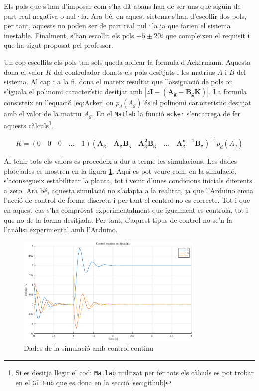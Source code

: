 \documentclass[12pt,a4paper,final,twoside,openright]{report}
\begin{document}
Els pols que s'han d'imposar com s'ha dit abans han de ser uns que siguin de part real negativa o nul·la. Ara bé, en aquest sistema s'han d'escollir dos pols, per tant, aquests no poden ser de part real nul·la ja que farien el sistema inestable. Finalment, s'han escollit els pols $-5\pm20i$ que compleixen el requisit i que ha sigut proposat pel professor. 

Un cop escollits els pols tan sols queda aplicar la formula d'Ackermann. Aquesta dona el valor $K$ del controlador donats els pols desitjats i les matrius $A$ i $B$ del sistema. Al cap i a la fi, dona el mateix resultat que l'assignació de pols on s'iguala el polinomi característic desitjat amb $|z \mathbf{I} - (\mathbf{A_g} - \mathbf{B_g K})|$. La formula consisteix en l'equació \eqref{eq:Acker} on $p_d(A_g)$ és el polinomi característic desitjat amb el valor de la matriu $A_g$. En el \texttt{Matlab} la funció \texttt{acker} s'encarrega de fer aquests càlculs\footnote{Si es desitja llegir el codi \texttt{Matlab} utilitzat per fer tots els càlculs es pot trobar en el \texttt{GitHub} que es dona en la secció \ref{sec:github}}.

\begin{equation}\label{eq:Acker}
K=(0\quad0\quad0\quad\dots\quad1)(\mathbf{A_g}\quad \mathbf{A_g B_g}\quad \mathbf{A_g^2 B_g}\quad \dots\quad \mathbf{A_g^{n-1} B_g})^{-1} p_d(A_g)
\end{equation}

Al tenir tots els valors es procedeix a dur a terme les simulacions. Les dades plotejades es mostren en la figura \ref{fig:cont_sim}. Aquí es pot veure com, en la simulació, s'aconsegueix estabilitzar la planta, tot i venir d'unes condicions inicials diferents a zero. Ara bé, aquesta simulació no s'adapta a la realitat, ja que l'Arduino envia l'acció de control de forma discreta i per tant el control no es correcte. Tot i que en aquest cas s'ha comprovat experimentalment que igualment es controla, tot i que no de la forma desitjada. Per tant, d'aquest tipus de control no se'n fa l'anàlisi experimental amb l'Arduino. 

\begin{figure}
\centering
\includegraphics[width=0.8\textwidth]{Imatges/cont_sim.eps}
\caption{Dades de la simulació amb control continu\label{fig:cont_sim}}
\end{figure}
\end{document}
